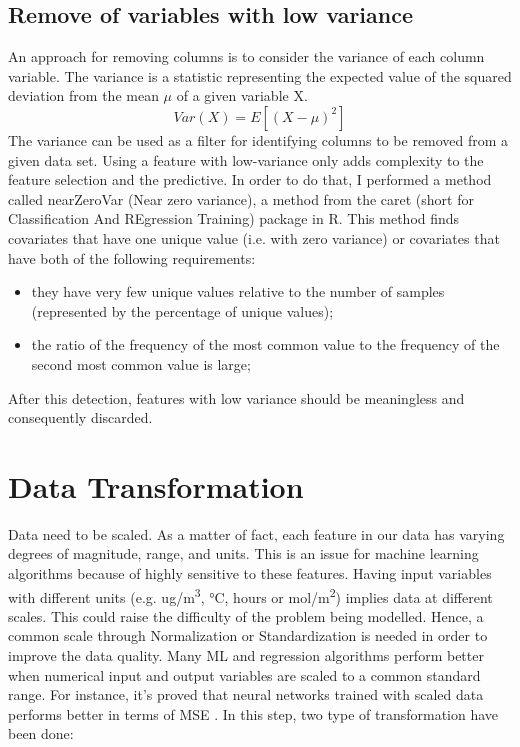 \subsection{Remove of variables with low variance}
An approach for removing columns is to consider the variance of each column variable. The variance is a statistic representing the expected value of the squared deviation from the mean $\mu$ of a given variable X. 
\begin{equation}
  Var(X) = E[(X-\mu)^2]
\end{equation}
The variance can be used as a filter for identifying columns to be removed from a given data set. 
Using a feature with low-variance only adds complexity to the feature selection and the predictive.\newline
In order to do that, I performed a method called nearZeroVar (Near zero variance), a method from the caret (short for Classification And REgression Training) package in R.
This method finds covariates that have one unique value (i.e. with zero variance) or covariates that have both of the following requirements:
\begin{itemize}
\item they have very few unique values relative to the number of samples (represented by the percentage of unique values);
\item the ratio of the frequency of the most common value to the frequency of the second most common value is large;
\end{itemize}
After this detection, features with low variance should be meaningless and consequently discarded. 
\section{Data Transformation}
Data need to be scaled. As a matter of fact, each feature in our data has varying degrees of magnitude, range, and units. This is an issue for machine learning algorithms because of highly sensitive to these features. 
Having input variables with different units (e.g. ug/m\textsuperscript{3}, °C, hours or mol/m\textsuperscript{2}) implies data at different scales. This could raise the difficulty of the problem being modelled. \newline
Hence, a common scale through Normalization or Standardization is needed in order to improve the data quality.\newline
Many ML and regression algorithms perform better when numerical input and output variables are scaled to a common standard range. \newline
For instance, it's proved that neural networks trained with scaled data performs better in terms of MSE \cite{shanker1996effect}.
In this step, two type of transformation have been done:
